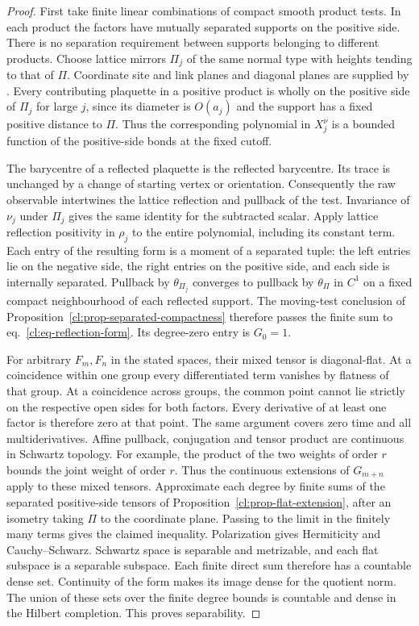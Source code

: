\documentclass[11pt,letterpaper,reqno]{amsart}
\numberwithin{equation}{section}
\renewcommand{\eqref}[1]{\textup{eq.~\ref{#1}}}
\theoremstyle{definition}
\theoremstyle{remark}
\begin{document}
\begin{proof}
First take finite linear combinations of compact smooth product
tests. In each product the factors have mutually separated
supports on the positive side. There is no separation
requirement between supports belonging to different products.
Choose lattice mirrors \(\Pi_j\) of the same normal type with
heights tending to that of \(\Pi\). Coordinate site and link
planes and diagonal planes are supplied by \cite[Theorem B]{LP}.
Every contributing plaquette in a positive product is wholly on
the positive side of \(\Pi_j\) for large \(j\), since its
diameter is \(O(a_j)\) and the support has a fixed positive
distance to \(\Pi\). Thus the corresponding polynomial in
\(X_j^\nu\) is a bounded function of the positive-side bonds at
the fixed cutoff.

The barycentre of a reflected plaquette is the reflected
barycentre. Its trace is unchanged by a change of starting
vertex or orientation. Consequently the raw observable
intertwines the lattice reflection and pullback of the test.
Invariance of \(\nu_j\) under \(\Pi_j\) gives the same identity
for the subtracted scalar. Apply lattice reflection positivity
in \(\rho_j\) to the entire polynomial, including its constant
term. Each entry of the resulting form is a moment of a
separated tuple: the left entries lie on the negative side,
the right entries on the positive side, and each side is
internally separated. Pullback by \(\theta_{\Pi_j}\) converges
to pullback by \(\theta_\Pi\) in \(C^1\) on a fixed compact
neighbourhood of each reflected support. The moving-test
conclusion of Proposition~\ref{cl:prop-separated-compactness}
therefore passes the finite sum to \eqref{cl:eq-reflection-form}.
Its degree-zero entry is \(G_0=1\).

For arbitrary \(F_m,F_n\) in the stated spaces, their mixed
tensor is diagonal-flat. At a coincidence within one group
every differentiated term vanishes by flatness of that group.
At a coincidence across groups, the common point cannot lie
strictly on the respective open sides for both factors.
Every derivative of at least one factor is therefore zero at
that point. The same argument covers zero time and all
multiderivatives. Affine pullback, conjugation and tensor
product are continuous in Schwartz topology. For example,
the product of the two weights of order \(r\) bounds the joint
weight of order \(r\). Thus the continuous extensions of
\(G_{m+n}\) apply to these mixed tensors. Approximate each
degree by finite sums of the separated positive-side tensors of
Proposition~\ref{cl:prop-flat-extension}, after an isometry
taking \(\Pi\) to the coordinate plane. Passing to the limit
in the finitely many terms gives the claimed inequality.
Polarization gives Hermiticity and Cauchy--Schwarz.
Schwartz space is separable and metrizable, and each flat
subspace is a separable subspace. Each finite direct sum
therefore has a countable dense set. Continuity of the form
makes its image dense for the quotient norm. The union of
these sets over the finite degree bounds is countable and
dense in the Hilbert completion. This proves separability.
\end{proof}
\end{document}
